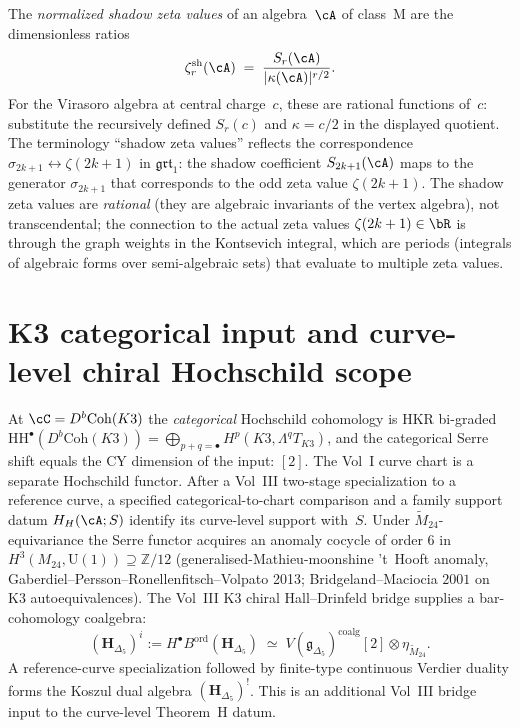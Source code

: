 \begin{remark}
\label{rem:normalized-shadow-zeta}
The \emph{normalized shadow zeta values} of an algebra~$\cA$
of class~M are the dimensionless ratios
\[
\zeta^{\mathrm{sh}}_r(\cA)
\;=\;
\frac{S_r(\cA)}{|\kappa(\cA)|^{r/2}}.
\]
For the Virasoro algebra at central charge~$c$, these are
rational functions of~$c$: substitute the recursively defined
$S_r(c)$ and $\kappa=c/2$ in the displayed quotient.
The terminology ``shadow zeta values'' reflects the
correspondence $\sigma_{2k+1} \leftrightarrow \zeta(2k+1)$
in $\mathfrak{grt}_1$: the shadow coefficient
$S_{2k+1}(\cA)$ maps to the generator $\sigma_{2k+1}$ that
corresponds to the odd zeta value $\zeta(2k+1)$. The shadow
zeta values are \emph{rational} (they are algebraic invariants
of the vertex algebra), not transcendental; the connection
to the actual zeta values $\zeta(2k+1) \in \bR$ is through
the graph weights in the Kontsevich integral, which are periods
(integrals of algebraic forms over semi-algebraic sets) that
evaluate to multiple zeta values.
\end{remark}

\section{K3 categorical input and curve-level chiral Hochschild scope}
\label{sec:chk-supplement}

\begin{remark}
\label{rem:chk-K3-cy2-shift}
At $\cC = D^b\mathrm{Coh}(K3)$ the \emph{categorical}
Hochschild cohomology is HKR bi-graded
$\mathrm{HH}^\bullet(D^b\mathrm{Coh}(K3)) = \bigoplus_{p+q=\bullet} H^p(K3, \Lambda^q T_{K3})$,
and the categorical Serre shift equals the CY dimension of the input:
$[2]$.  The Vol~I curve chart is a separate Hochschild functor.  After
a Vol~III two-stage specialization to a reference curve, a specified
categorical-to-chart comparison and a family support datum
$H_H(\cA;S)$ identify its curve-level support with~$S$.
Under $\widetilde{M}_{24}$-equivariance the Serre functor acquires an
anomaly cocycle of order $6$ in
$H^3(M_{24}, \mathrm{U}(1)) \supseteq \mathbb{Z}/12$
(generalised-Mathieu-moonshine 't~Hooft anomaly,
Gaberdiel--Persson--Ronellenfitsch--Volpato 2013;
Bridgeland--Maciocia $2001$ on K3 autoequivalences). The Vol~III
K3 chiral Hall--Drinfeld bridge supplies a bar-cohomology coalgebra:
\[
(\mathbf{H}_{\Delta_5})^i
:=H^\bullet B^{\mathrm{ord}}(\mathbf{H}_{\Delta_5})
\;\simeq\;
V(\mathfrak{g}_{\Delta_5})^{\mathrm{coalg}}[2]
\otimes \eta_{\widetilde{M}_{24}}.
\]
A reference-curve specialization followed by finite-type continuous
Verdier duality forms the Koszul dual algebra
$(\mathbf{H}_{\Delta_5})^!$.  This is an additional Vol~III bridge
input to the curve-level Theorem~H datum.
\end{remark}

